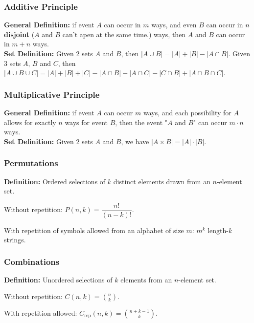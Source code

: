 \documentclass[5pt]{article}
\begin{document}
\begin{multicols}{2}
\subsubsection{Additive Principle}
\textbf{General Definition:} 
if event $A$ can occur in $m$ ways, and even $B$ can occur in $n$ \textbf{disjoint} ($A$ and $B$ can't apen at the same time.) ways, then $A$ and $B$ can occur in $m+n$ ways.\\   
\textbf{Set Definition:} Given 2 sets $A$ and $B$, then $|A\cup B| = |A| + |B| - |A\cap B|$. Given 3 sets $A$, $B$ and $C$, then $|A\cup B\cup C| = |A| + |B| + |C| - |A\cap B| - |A\cap C|- |C\cap B|+|A\cap B\cap C|$.


\subsubsection{Multiplicative Principle}
\textbf{General Definition:} if event $A$ can occur $m$ ways, and each possibility for $A$ allows for exactly $n$ ways for event $B$, then the event "$A$ and $B$" can occur $m\cdot n$ ways.\\
\textbf{Set Definition:} Given 2 sets $A$ and $B$, we have $|A\times B|=|A|\cdot|B|$.

\subsubsection{Permutations}
\textbf{Definition:} Ordered selections of $k$ distinct elements drawn from an $n$-element set.\\
\begin{itemize*}
    \item Without repetition: $P(n,k)=\dfrac{n!}{(n-k)!}$.
    \item With repetition of symbols allowed from an alphabet of size $m$: $m^k$ length-$k$ strings.
\end{itemize*}

\subsubsection{Combinations}
\textbf{Definition:} Unordered selections of $k$ elements from an $n$-element set.\\
\begin{itemize*}
    \item Without repetition: $C(n,k)=\binom{n}{k}$.
    \item With repetition allowed: $C_{\text{rep}}(n,k)=\binom{n+k-1}{k}$.
\end{itemize*}


\end{multicols}
\end{document}
